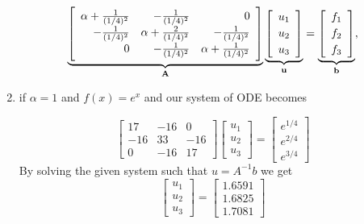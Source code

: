 \begin{solution}
\begin{enumerate}
\[
  \underbrace{\left[\begin{array}{rrr}
              \alpha+\frac{1}{(1/4)^2} & -\frac{1}{(1/4)^2}&0 \\[0.25em]
               -\frac{1}{(1/4)^2} & \alpha+\frac{2}{(1/4)^2} &  -\frac{1}{(1/4)^2}  \\[0.25em]
                 0 &   -\frac{1}{(1/4)^2}   & \alpha+\frac{1}{(1/4)^2} 
               \end{array}\right]}_{\bf A}
          \underbrace{\left[\begin{array}{c} u_1 \\[0.25em] u_2 \\[0.25em] u_{3} \end{array}\right]}_{\bf u}
 =   \underbrace{\left[\begin{array}{c} f_1 \\[0.25em] f_2 \\[0.25em] f_3  \end{array}\right]}_{\bf b},
\]


\item if $\alpha=1$ and $f(x)=e^x$ and our system of ODE becomes

\[
  \left[\begin{array}{rrr}
              17 & -16&0 \\[0.25em]
               -16 & 33 &  -16  \\[0.25em]
                 0 &   -16  & 17 
               \end{array}\right]
          \left[\begin{array}{c} u_1 \\[0.25em] u_2 \\[0.25em] u_{3} \end{array}\right]
 = \left[\begin{array}{c} e^{1/4} \\[0.25em] e^{2/4} \\[0.25em] e^{3/4}  \end{array}\right]
\]
By solving the given system such that $u=A^{-1} b$ we get
\[\left[\begin{array}{c} u_1 \\[0.25em] u_2 \\[0.25em] u_{3}\end{array}\right]=\left[\begin{array}{c} 1.6591 \\[0.25em]  1.6825 \\[0.25em] 1.7081 \end{array}\right]
 \]
 

\end{enumerate}
\end{solution}
